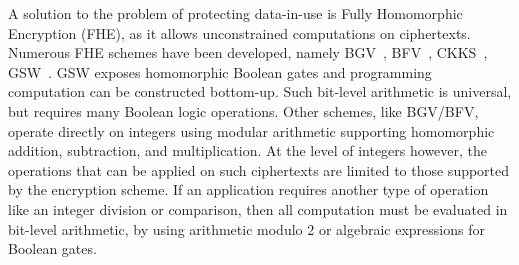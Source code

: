 

A solution to the problem of protecting data-in-use is Fully Homomorphic Encryption (FHE), as it allows unconstrained computations on ciphertexts. Numerous FHE schemes have been developed, namely BGV~\cite{BGV_ref}, BFV~\cite{fan2012somewhatmisc}, CKKS~\cite{CKKS_ref}, GSW~\cite{GSW_ref}. 
GSW exposes homomorphic Boolean gates and programming computation can be constructed bottom-up.
Such bit-level arithmetic is universal, but requires many Boolean logic operations.
Other schemes, like BGV/BFV, operate directly on integers using modular arithmetic supporting homomorphic addition, subtraction, and multiplication.
At the level of integers however, the operations that can be applied on such ciphertexts are limited to those supported by the encryption scheme.
If an application requires another type of operation like an integer division or comparison, then all computation must be evaluated in bit-level arithmetic, by using arithmetic modulo 2 or algebraic expressions for Boolean gates.

